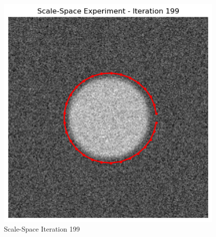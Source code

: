 \documentclass[10pt,twocolumn,letterpaper]{article}
\begin{document}
\begin{figure}[h!]
    \centering
    \includegraphics[width=0.5\linewidth]{output_122_simple_3244.png}
    \caption{Scale-Space Iteration 199}
    \label{fig:enter-label}
\end{figure}
{\small


}
\end{document}
